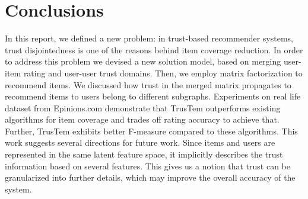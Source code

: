 \documentclass[11pt, conference, onecolumn]{IEEEtran}
\begin{document}
\section{Conclusions}
In this report, we defined a new problem: in trust-based recommender systems, trust disjointedness is one of the reasons behind item coverage reduction. In order to address this problem we devised a new solution model, based on merging user-item rating and user-user trust domains. Then, we employ matrix factorization to recommend items. We discussed how trust in the merged matrix propagates to recommend items to users belong to different subgraphs. 
Experiments on real life dataset from Epinions.com demonstrate that TrusTem outperforms existing algorithms for item coverage and trades off rating accuracy to achieve that. Further, TrusTem exhibits better F-measure compared to these algorithms. This work suggests several directions for future work. Since items and users are represented in the same latent feature space, it implicitly describes the trust information based on several features. This gives us a notion that trust can be granularized into further details, which may improve the overall accuracy of the system. 


   
    
\end{document}
